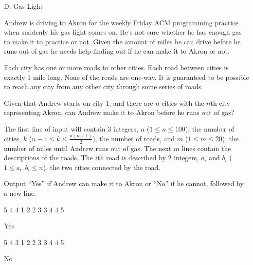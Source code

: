 \begin{problem}{D: Gas Light}

Andrew is driving to Akron for the weekly Friday ACM programming practice when suddenly his gas light comes on.
He's not sure whether he has enough gas to make it to practice or not.
Given the amount of miles he can drive before he runs out of gas he needs help finding out if he can make it to Akron or not.

Each city has one or more roads to other cities.
Each road between cities is exactly 1 mile long.
None of the roads are one-way.
It is guaranteed to be possible to reach any city from any other city through some series of roads.

Given that Andrew starts on city 1, and there are $n$ cities with the $n$th city representing Akron, can Andrew make it to Akron before he runs out of gas?
\end{problem}

\begin{formalin}
The first line of input will contain 3 integers, $n$ ($1 \leq n \leq 100$), the number of cities, $k$ ($n - 1 \leq k \leq \frac {n(n-1)}{2}$), the number of roads, and $m$ ($1 \leq m \leq 20$), the number of miles until Andrew runs out of gas.
The next $m$ lines contain the descriptions of the roads.
The $i$th road is described by 2 integers, $a_i$ and $b_i$ ($1 \leq a_i, b_i \leq n$), the two cities connected by the road.
\end{formalin}

\begin{formalout}
Output ``Yes'' if Andrew can make it to Akron or ``No'' if he cannot, followed by a new line.
\end{formalout}

\begin{datain}
5 4 4
1 2
2 3
3 4
4 5
\end{datain}
\begin{dataout}
Yes
\end{dataout}

\begin{datain}
5 4 3
1 2
2 3
3 4
4 5
\end{datain}
\begin{dataout}
No
\end{dataout}
